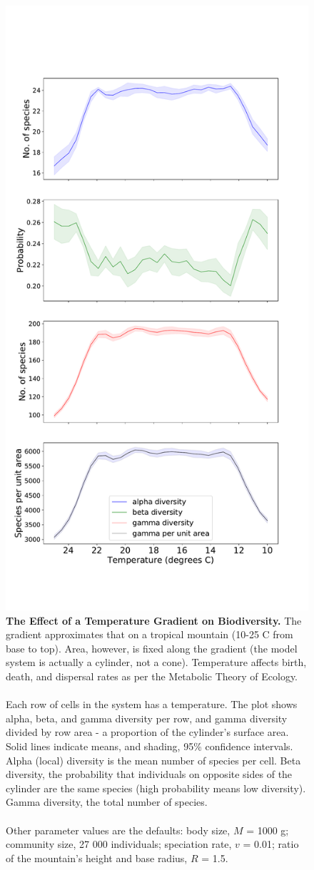 \documentclass[11pt]{article}
\begin{document}
\begin{figure}[!hbtp]
\vspace*{-3cm}
\centering
	\includegraphics[width=0.6\linewidth]{../Results/DiversityPlots/TempNoArea.pdf}
	\vspace*{-1.5cm}
	\caption{\textbf{The Effect of a Temperature Gradient on Biodiversity.} The gradient approximates that on a tropical mountain (10-25 \degree C from base to top). Area, however, is fixed along the gradient (the model system is actually a cylinder, not a cone). Temperature affects birth, death, and dispersal rates as per the Metabolic Theory of Ecology.\\
	\\Each row of cells in the system has a temperature. The plot shows alpha, beta, and gamma diversity per row, and gamma diversity divided by row area - a proportion of the cylinder’s surface area. Solid lines indicate means, and shading, 95\% confidence intervals. Alpha (local) diversity is the mean number of species per cell. Beta diversity, the probability that individuals on opposite sides of the cylinder are the same species (high probability means low diversity). Gamma diversity, the total number of species.\\
	\\Other parameter values are the defaults: body size, $M$ = 1000 g; community size, 27 000 individuals; speciation rate, $v$ = 0.01; ratio of the mountain's height and base radius, $R$ = 1.5.}
\label{AltGradTemp}
\end{figure}
\end{document}
